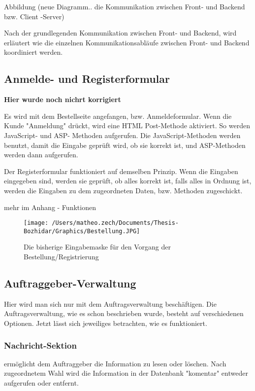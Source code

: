Abbildung (neue Diagramm.. die Kommunikation zwischen Front- und Backend bzw. Client -Server)

Nach der grundlegenden Kommunikation zwischen Front- und Backend, wird erläutert wie die einzelnen Kommunikationsabläufe zwischen Front- und Backend koordiniert werden.

\subsection{Anmelde- und Registerformular} 

\textbf{Hier wurde noch nichrt korrigiert}

Es wird mit dem Bestellseite angefangen, bzw. Anmeldeformular. Wenn die Kunde "Anmeldung" drückt, wird eine HTML Post-Methode aktiviert.  So werden JavaScript- und ASP- Methoden aufgerufen. Die JavaScript-Methoden werden benutzt, damit die Eingabe geprüft wird, ob sie korrekt ist, und ASP-Methoden werden dann aufgerufen. 

Der Registerformular funktioniert auf demselben Prinzip. Wenn die Eingaben eingegeben sind, werden sie geprüft, ob alles korrekt ist, falls alles in Ordnung ist, werden die Eingaben zu dem zugeordneten Daten, bzw. Methoden zugeschickt.

mehr im Anhang - Funktionen

\begin{figure}[h]
	\centering
	\texttt{[image: /Users/matheo.zech/Documents/Thesis-Bozhidar/Graphics/Bestellung.JPG]}
	\caption[Anmeldung/Bestellung]{Die bisherige Eingabemaske für den Vorgang der Bestellung/Registrierung}
	\label{fig:Bestellung}
\end{figure}

\subsection{Auftraggeber-Verwaltung}

Hier wird man sich nur mit dem Auftragsverwaltung beschäftigen. Die Auftragsverwaltung, wie es schon beschrieben wurde, besteht auf verschiedenen Optionen. Jetzt lässt sich jeweiliges betrachten, wie es funktioniert. 
	
\subsubsection{Nachricht-Sektion} ermöglicht dem Auftraggeber die Information zu lesen oder löschen. Nach zugeordnetem Wahl wird die Information in der Datenbank "komentar" entweder aufgerufen oder entfernt. 

